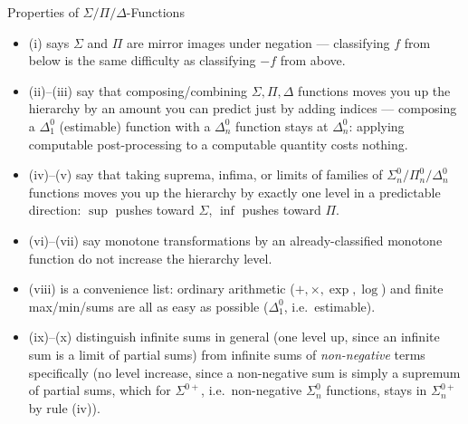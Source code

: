 \documentclass[aspectratio=169,10pt]{beamer}
\begin{document}
\begin{frame}[allowframebreaks]{Properties of $\Sigma/\Pi/\Delta$-Functions}
  \begin{itemize}
    \item (i) says $\Sigma$ and $\Pi$ are mirror images under negation ---
      classifying $f$ from below is the same difficulty as classifying $-f$
      from above.
    \item (ii)--(iii) say that composing/combining $\Sigma,\Pi,\Delta$
      functions moves you up the hierarchy by an amount you can predict just
      by adding indices --- composing a $\Delta_1^0$ (estimable) function with
      a $\Delta_n^0$ function stays at $\Delta_n^0$: applying computable
      post-processing to a computable quantity costs nothing.
    \item (iv)--(v) say that taking suprema, infima, or limits of families
      of $\Sigma_n^0/\Pi_n^0/\Delta_n^0$ functions moves you up the hierarchy
      by exactly one level in a predictable direction: $\sup$ pushes toward
      $\Sigma$, $\inf$ pushes toward $\Pi$.
    \item (vi)--(vii) say monotone transformations by an already-classified
      monotone function do not increase the hierarchy level.
    \item (viii) is a convenience list: ordinary arithmetic
      ($+,\times,\exp,\log$) and finite max/min/sums are all as easy as
      possible ($\Delta_1^0$, i.e.\ estimable).
    \item (ix)--(x) distinguish infinite sums in general (one level up, since
      an infinite sum is a limit of partial sums) from infinite sums of
      \emph{non-negative} terms specifically (no level increase, since a
      non-negative sum is simply a supremum of partial sums, which for
      $\Sigma^{0+}$, i.e.\ non-negative $\Sigma_n^0$ functions, stays in
      $\Sigma_n^{0+}$ by rule (iv)).
  \end{itemize}
\end{frame}
\end{document}
